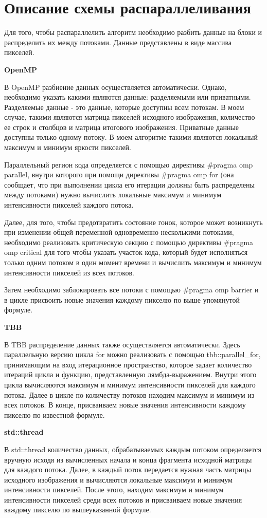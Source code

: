 \documentclass{report}
\begin{document}
\section*{Описание схемы распараллеливания}
\par Для того, чтобы распараллелить алгоритм необходимо разбить данные на блоки и распределить их между потоками. Данные представлены в виде массива пикселей.
\par \textbf{OpenMP} 
\par В OpenMP разбиение данных осуществляется автоматически. Однако, необходимо указать какими являются данные: разделяемыми или приватными. Разделяемые данные - это данные, которые доступны всем потокам. В моем случае, такими являются матрица пикселей исходного изображения, количество ее строк и столбцов и матрица итогового изображения. Приватные данные доступны только одному потоку. В моем алгоритме такими являются локальный максимум и минимум яркости пикселей. 
\par Параллельный регион кода определяется с помощью директивы \#pragma omp parallel, внутри которого при помощи директивы \#pragma omp for (она сообщает, что при выполнении цикла его итерации должны быть распределены между потоками) нужно вычислить локальные максимум и минимум интенсивности пикселей каждого потока. 
\par Далее, для того, чтобы предотвратить состояние гонок, которое может возникнуть при изменении общей переменной одновременно несколькими потоками, необходимо реализовать критическую секцию с помощью директивы \#pragma omp critical для того чтобы указать участок кода, который будет исполняться только одним потоком в один момент времени и вычислить максимум и минимум интенсивности пикселей из всех потоков. 
\par Затем необходимо заблокировать все потоки с помощью \#pragma omp barrier и в цикле присвоить новые значения каждому пикселю по выше упомянутой формуле. 
\par \textbf{TBB}
\par В TBB распределение данных также осуществляется автоматически. Здесь параллельную версию цикла for можно реализовать с помощью tbb::parallel\_for, принимающим на вход итерационное пространство, которое задает количество итераций цикла и функцию, представленную лямбда-выражением. Внутри этого цикла вычисляются максимум и минимум интенсивности пикселей для каждого потока. Далее в цикле по количеству потоков находим максимум и минимум из всех потоков. В конце, присваиваем новые значения интенсивности каждому пикселю по известной формуле.
\par \textbf{std::thread}
\par В std::thread количество данных, обрабатываемых каждым потоком определяется вручную исходя из вычисленных начала и конца фрагмента исходной матрицы для каждого потока. Далее, в каждый поток передается нужная часть матрицы исходного изображения и вычисляются локальные максимум и минимум интенсивности пикселей. После этого, находим максимум и минимум интенсивности пикселей среди всех потоков и присваиваем новые значения каждому пикселю по вышеуказанной формуле.
\newpage
\end{document}

